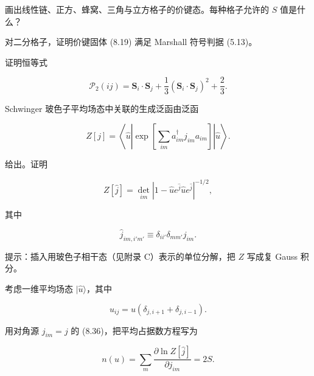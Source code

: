 \begin{exercises}

\item 画出线性链、正方、蜂窝、三角与立方格子的价键态。每种格子允许的 $S$ 值是什么？

\item 对二分格子，证明价键固体 (8.19) 满足 Marshall 符号判据 (5.13)。

\item 证明恒等式

\begin{equation*}
\mathcal {P} _ {2} ( ij ) = \mathbf {S} _ {i} \cdot \mathbf {S} _ {j} + \frac {1}{3} \left( \mathbf {S} _ {i} \cdot \mathbf {S} _ {j} \right) ^ {2} + \frac {2}{3}.
\tag{8.34}
\end{equation*}

\item Schwinger 玻色子平均场态中关联的生成泛函由泛函

\begin{equation*}
Z [ j ] = \left\langle \hat {u} \left| \exp \left[ \sum_ {im} a _ {im} ^ {\dagger} j _ {im} a _ {im} \right] \right| \hat {u} \right\rangle .
\tag{8.35}
\end{equation*}

给出。证明

\begin{equation*}
Z [ \hat {j} ] = \det_{im} \left| 1 - \hat {u} e ^ {\hat {j}} \hat {u} e ^ {\hat {j}} \right| ^ {-1/2} ,
\tag{8.36}
\end{equation*}

其中

\begin{equation*}
\hat {j} _ {im, i'm'} \equiv \delta_ {ii '} \delta_ {mm '} j _ {im}.
\tag{8.37}
\end{equation*}

提示：插入用玻色子相干态（见附录 C）表示的单位分解，把 $Z$ 写成复 Gauss 积分。

\item 考虑一维平均场态 $|\hat{u}\rangle$，其中

\begin{equation*}
\hat {u} _ {ij} = u \left( \delta_ {j, i + 1} + \delta_ {j, i - 1} \right).
\tag{8.38}
\end{equation*}

用对角源 $j_{im} = j$ 的 (8.36)，把平均占据数方程写为

\begin{equation*}
n ( u ) = \sum_ {m} \frac {\partial \ln Z [ \hat {j} ]}{\partial j _ {im}} = 2 S.
\tag{8.39}
\end{equation*}


\end{exercises}
